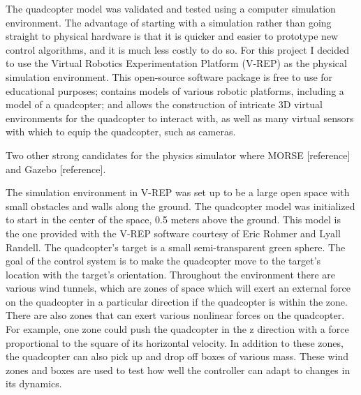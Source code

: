 \documentclass[letterpaper,12pt,titlepage,oneside,final]{book}
\begin{document}

The quadcopter model was validated and tested using a computer simulation environment. 
The advantage of starting with a simulation rather than going straight to physical hardware is that it is quicker and easier to prototype new control algorithms, and it is much less costly to do so. 
For this project I decided to use the Virtual Robotics Experimentation Platform (V-REP)\cite{vrep} as the physical simulation environment.
This open-source software package is free to use for educational purposes; 
contains models of various robotic platforms, including a model of a quadcopter; 
and allows the construction of intricate 3D virtual environments for the quadcopter to interact with, as well as many virtual sensors with which to equip the quadcopter, such as cameras.

Two other strong candidates for the physics simulator where MORSE [reference] and Gazebo [reference]. 


The simulation environment in V-REP was set up to be a large open space with small obstacles and walls along the ground. 
The quadcopter model was initialized to start in the center of the space, 0.5 meters above the ground. 
This model is the one provided with the V-REP software courtesy of Eric Rohmer and Lyall Randell. 
The quadcopter's target is a small semi-transparent green sphere. The goal of the control system is to make the quadcopter move to the target's location with the target's orientation. 
Throughout the environment there are various wind tunnels, which are zones of space which will exert an external force on the quadcopter in a particular direction if the quadcopter is within the zone. 
There are also zones that can exert various nonlinear forces on the quadcopter. 
For example, one zone could push the quadcopter in the z direction with a force proportional to the square of its horizontal velocity. 
In addition to these zones, the quadcopter can also pick up and drop off boxes of various mass. 
These wind zones and boxes are used to test how well the controller can adapt to changes in its dynamics.

\end{document}
